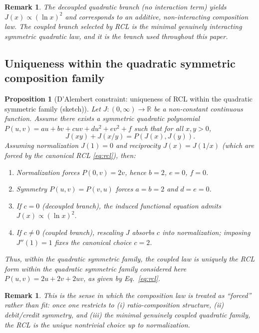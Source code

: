 \documentclass[entropy,article,submit,pdftex,moreauthors]{Definitions/mdpi}
\newcommand{\RR}{\mathbb{R}}
\newtheorem{propositionX}[theoremX]{Proposition}
\newtheorem{remarkX}[theoremX]{Remark}
\begin{document}
\begin{remarkX}
The decoupled quadratic branch (no interaction term) yields \(J(x)\propto(\ln x)^2\) and corresponds to an additive, non-interacting composition law.
The coupled branch selected by RCL is the minimal genuinely interacting symmetric quadratic law, and it is the branch used throughout this paper.
\end{remarkX}

\subsection{Uniqueness within the quadratic symmetric composition family}
\label{app:rcl-inevitability}

\begin{propositionX}[D'Alembert constraint: uniqueness of RCL within the quadratic symmetric family (sketch)]
\label{prop:rcl-inevitability}
Let \(J:(0,\infty)\to\RR\) be a non-constant continuous function.
Assume there exists a symmetric quadratic polynomial \(P(u,v)=a u+b v+cuv+d u^2+e v^2+f\) such that for all \(x,y>0\),
\begin{equation}
  J(xy)+J(x/y)=P(J(x),J(y)).
  \label{eq:quadratic-family}
\end{equation}
Assuming normalization \(J(1)=0\) and reciprocity \(J(x)=J(1/x)\) (which are forced by the canonical RCL \eqref{eq:rcl}), then:
\begin{enumerate}[label=(\alph*), itemsep=1pt]
  \item Normalization forces \(P(0,v)=2v\), hence \(b=2\), \(e=0\), \(f=0\).
  \item Symmetry \(P(u,v)=P(v,u)\) forces \(a=b=2\) and \(d=e=0\).
  \item If \(c=0\) (decoupled branch), the induced functional equation admits \(J(x)\propto(\ln x)^2\).
  \item If \(c\neq 0\) (coupled branch), rescaling \(J\) absorbs \(c\) into normalization; imposing \(J''(1)=1\) fixes the canonical choice \(c=2\).
\end{enumerate}
Thus, within the quadratic symmetric family, the coupled law is uniquely the RCL form within the quadratic symmetric family considered here
\(P(u,v)=2u+2v+2uv\), as given by Eq.~\eqref{eq:rcl}.
\end{propositionX}

\begin{remarkX}
This is the sense in which the composition law is treated as ``forced'' rather than fit: once one restricts to (i) ratio-composition structure, (ii) debit/credit symmetry, and (iii) the minimal genuinely coupled quadratic family, the RCL is the unique nontrivial choice up to normalization.
\end{remarkX}
\end{document}
